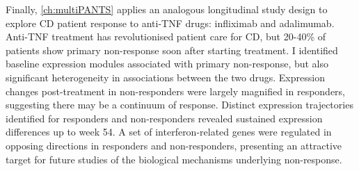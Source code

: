 Finally, \cref{ch:multiPANTS} applies an analogous longitudinal study design to explore \gls{CD} patient response to anti-\gls{TNF} drugs: infliximab and adalimumab.
Anti-\gls{TNF} treatment has revolutionised patient care for \gls{CD},
but 20-40\% of patients show primary non-response soon after starting treatment.
I identified baseline expression modules associated with primary non-response, but also significant heterogeneity in associations between the two drugs.
Expression changes post-treatment in non-responders were largely magnified in responders, suggesting there may be a continuum of response.
Distinct expression trajectories identified for responders and non-responders revealed sustained expression differences up to week 54.
A set of interferon-related genes were regulated in opposing directions in responders and non-responders,
presenting an attractive target for future studies of the biological mechanisms underlying non-response.


